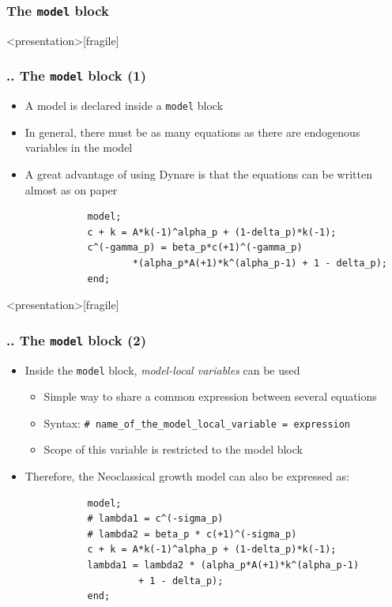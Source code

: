 \documentclass[11pt,aspectratio=169]{beamer}
\begin{document}
\subsubsection{The \texttt{model} block}
\begin{frame}<presentation>[fragile]
	\frametitle{{\thesection.\thesubsection.\thesubsubsection} The \texttt{model} block (1)}
	\begin{itemize}
		\item A model is declared inside a \texttt{model} block 
		\item In general, there must be as many equations as there are endogenous variables in the model 
		\item A great advantage of using Dynare is that the equations can be written almost as on paper
		\begin{verbatim}
		   model;
		   c + k = A*k(-1)^alpha_p + (1-delta_p)*k(-1);
		   c^(-gamma_p) = beta_p*c(+1)^(-gamma_p)
		           *(alpha_p*A(+1)*k^(alpha_p-1) + 1 - delta_p);
		   end;
		\end{verbatim}
	\end{itemize}
\end{frame}
\begin{frame}<presentation>[fragile]
	\frametitle{{\thesection.\thesubsection.\thesubsubsection} The \texttt{model} block (2)}
	\begin{itemize}
		\item Inside the \texttt{model} block, \textit{model-local variables} can be used
		\begin{itemize}
			\item Simple way to share a common expression between several equations
			\item Syntax: \texttt{\# name\_of\_the\_model\_local\_variable = expression}
			\item Scope of this variable is restricted to the model block			 
		\end{itemize}
		\item Therefore, the Neoclassical growth model can also be expressed as:
		\begin{verbatim}
		   model;
		   # lambda1 = c^(-sigma_p)
		   # lambda2 = beta_p * c(+1)^(-sigma_p)
		   c + k = A*k(-1)^alpha_p + (1-delta_p)*k(-1);
		   lambda1 = lambda2 * (alpha_p*A(+1)*k^(alpha_p-1) 
		            + 1 - delta_p);
		   end;
		\end{verbatim}
	\end{itemize}
\end{frame}
\end{document}

